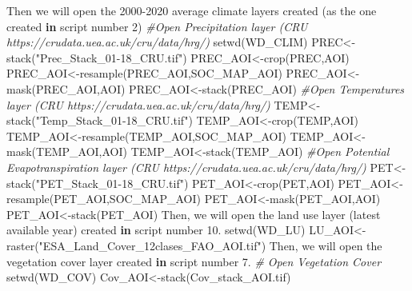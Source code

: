 \documentclass[
  10pt,
  b5paper,
]{book}
\newenvironment{Shaded}{\begin{snugshade}}{\end{snugshade}}
\newcommand{\CommentTok}[1]{\textcolor[rgb]{0.56,0.35,0.01}{\textit{#1}}}
\newcommand{\ControlFlowTok}[1]{\textcolor[rgb]{0.13,0.29,0.53}{\textbf{#1}}}
\newcommand{\DecValTok}[1]{\textcolor[rgb]{0.00,0.00,0.81}{#1}}
\newcommand{\FloatTok}[1]{\textcolor[rgb]{0.00,0.00,0.81}{#1}}
\newcommand{\FunctionTok}[1]{\textcolor[rgb]{0.00,0.00,0.00}{#1}}
\newcommand{\NormalTok}[1]{#1}
\newcommand{\OtherTok}[1]{\textcolor[rgb]{0.56,0.35,0.01}{#1}}
\newcommand{\StringTok}[1]{\textcolor[rgb]{0.31,0.60,0.02}{#1}}
\begin{document}
\begin{Shaded}
\begin{Highlighting}[]
\NormalTok{Then we will open the }\DecValTok{2000{-}2020}\NormalTok{ average climate layers }\FunctionTok{created}\NormalTok{ (as the one created }\ControlFlowTok{in}\NormalTok{ script number }\DecValTok{2}\NormalTok{)}
\CommentTok{\#Open Precipitation layer (CRU https://crudata.uea.ac.uk/cru/data/hrg/)}
\FunctionTok{setwd}\NormalTok{(WD\_CLIM)}
\NormalTok{PREC}\OtherTok{\textless{}{-}}\FunctionTok{stack}\NormalTok{(}\StringTok{"Prec\_Stack\_01{-}18\_CRU.tif"}\NormalTok{)}
\NormalTok{PREC\_AOI}\OtherTok{\textless{}{-}}\FunctionTok{crop}\NormalTok{(PREC,AOI)}
\NormalTok{PREC\_AOI}\OtherTok{\textless{}{-}}\FunctionTok{resample}\NormalTok{(PREC\_AOI,SOC\_MAP\_AOI)}
\NormalTok{PREC\_AOI}\OtherTok{\textless{}{-}}\FunctionTok{mask}\NormalTok{(PREC\_AOI,AOI)}
\NormalTok{PREC\_AOI}\OtherTok{\textless{}{-}}\FunctionTok{stack}\NormalTok{(PREC\_AOI)}
\CommentTok{\#Open Temperatures layer (CRU https://crudata.uea.ac.uk/cru/data/hrg/)}
\NormalTok{TEMP}\OtherTok{\textless{}{-}}\FunctionTok{stack}\NormalTok{(}\StringTok{"Temp\_Stack\_01{-}18\_CRU.tif"}\NormalTok{)}
\NormalTok{TEMP\_AOI}\OtherTok{\textless{}{-}}\FunctionTok{crop}\NormalTok{(TEMP,AOI)}
\NormalTok{TEMP\_AOI}\OtherTok{\textless{}{-}}\FunctionTok{resample}\NormalTok{(TEMP\_AOI,SOC\_MAP\_AOI)}
\NormalTok{TEMP\_AOI}\OtherTok{\textless{}{-}}\FunctionTok{mask}\NormalTok{(TEMP\_AOI,AOI)}
\NormalTok{TEMP\_AOI}\OtherTok{\textless{}{-}}\FunctionTok{stack}\NormalTok{(TEMP\_AOI)}
\CommentTok{\#Open Potential Evapotranspiration layer (CRU https://crudata.uea.ac.uk/cru/data/hrg/)}
\NormalTok{PET}\OtherTok{\textless{}{-}}\FunctionTok{stack}\NormalTok{(}\StringTok{"PET\_Stack\_01{-}18\_CRU.tif"}\NormalTok{)}
\NormalTok{PET\_AOI}\OtherTok{\textless{}{-}}\FunctionTok{crop}\NormalTok{(PET,AOI)}
\NormalTok{PET\_AOI}\OtherTok{\textless{}{-}}\FunctionTok{resample}\NormalTok{(PET\_AOI,SOC\_MAP\_AOI)}
\NormalTok{PET\_AOI}\OtherTok{\textless{}{-}}\FunctionTok{mask}\NormalTok{(PET\_AOI,AOI)}
\NormalTok{PET\_AOI}\OtherTok{\textless{}{-}}\FunctionTok{stack}\NormalTok{(PET\_AOI)}
\NormalTok{Then, we will open the land use }\FunctionTok{layer}\NormalTok{ (latest available year) created }\ControlFlowTok{in}\NormalTok{ script number }\FloatTok{10.}
\FunctionTok{setwd}\NormalTok{(WD\_LU)}
\NormalTok{LU\_AOI}\OtherTok{\textless{}{-}}\FunctionTok{raster}\NormalTok{(}\StringTok{"ESA\_Land\_Cover\_12clases\_FAO\_AOI.tif"}\NormalTok{)}
\NormalTok{Then, we will open the vegetation cover layer created }\ControlFlowTok{in}\NormalTok{ script number }\FloatTok{7.}
\CommentTok{\# Open Vegetation Cover }
\FunctionTok{setwd}\NormalTok{(WD\_COV)}
\NormalTok{Cov\_AOI}\OtherTok{\textless{}{-}}\FunctionTok{stack}\NormalTok{(}\StringTok{\textquotesingle{}Cov\_stack\_AOI.tif\textquotesingle{}}\NormalTok{)}

\end{Highlighting}
\end{Shaded}
\end{document}
